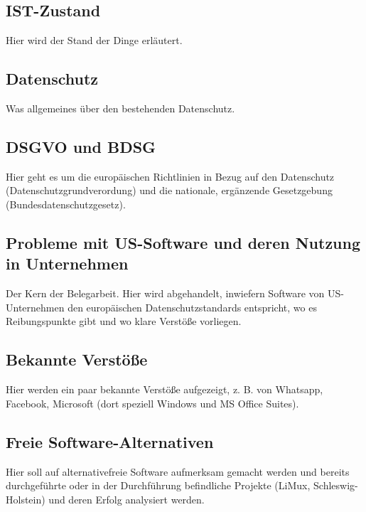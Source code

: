 \subsection{IST-Zustand}
    Hier wird der Stand der Dinge erläutert.

\subsection{Datenschutz}
    Was allgemeines über den bestehenden Datenschutz.

\subsection{DSGVO und BDSG}
    Hier geht es um die europäischen Richtlinien in Bezug auf den Datenschutz (Datenschutzgrundverordung) und die nationale, ergänzende Gesetzgebung (Bundesdatenschutzgesetz).

\subsection{Probleme mit US-Software und deren Nutzung in Unternehmen}
    Der Kern der Belegarbeit. Hier wird abgehandelt, inwiefern Software von US-Unternehmen den europäischen Datenschutzstandards entspricht, wo es Reibungspunkte gibt und wo klare Verstöße vorliegen.

\subsection{Bekannte Verstöße}
    Hier werden ein paar bekannte Verstöße aufgezeigt, z. B. von Whatsapp, Facebook, Microsoft (dort speziell Windows und MS Office Suites).

\subsection{Freie Software-Alternativen}
    Hier soll auf alternativefreie Software aufmerksam gemacht werden und bereits durchgeführte oder in der Durchführung befindliche Projekte (LiMux, Schleswig-Holstein) und deren Erfolg analysiert werden.